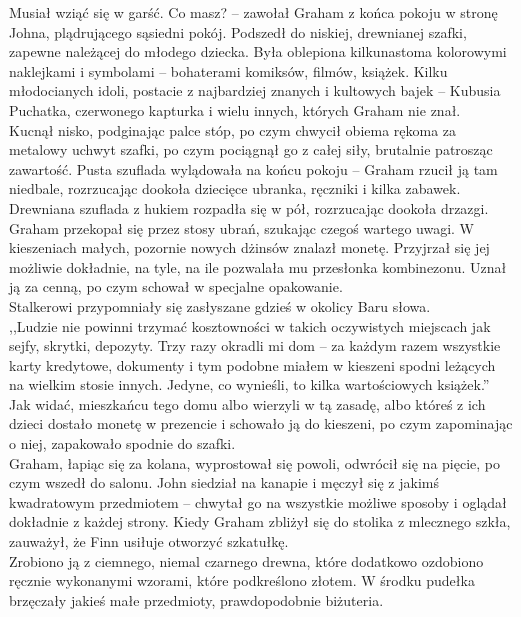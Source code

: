 \documentclass[../MAIN.tex]{subfiles}
\begin{document}
Musiał wziąć się w garść.
% 
% 
% 
% 
\sx Co masz? -- zawołał Graham z końca pokoju w stronę Johna, plądrującego sąsiedni pokój.
\qd
Podszedł do niskiej, drewnianej szafki, zapewne należącej do młodego dziecka. Była oblepiona kilkunastoma kolorowymi naklejkami i symbolami -- bohaterami komiksów, filmów, książek. Kilku młodocianych idoli, postacie z najbardziej znanych i kultowych bajek -- Kubusia Puchatka, czerwonego kapturka i wielu innych, których Graham nie znał.\\
Kucnął nisko, podginając palce stóp, po czym chwycił obiema rękoma za metalowy uchwyt szafki, po czym pociągnął go z całej siły, brutalnie patrosząc zawartość. Pusta szuflada wylądowała na końcu pokoju -- Graham rzucił ją tam niedbale, rozrzucając dookoła dziecięce ubranka, ręczniki i kilka zabawek.\\
Drewniana szuflada z hukiem rozpadła się w pół, rozrzucając dookoła drzazgi.\\
Graham przekopał się przez stosy ubrań, szukając czegoś wartego uwagi. W kieszeniach małych, pozornie nowych dżinsów znalazł monetę. Przyjrzał się jej możliwie dokładnie, na tyle, na ile pozwalała mu przesłonka kombinezonu. Uznał ją za cenną, po czym schował w specjalne opakowanie.\\
Stalkerowi przypomniały się zasłyszane gdzieś w okolicy Baru słowa.\\
,,Ludzie nie powinni trzymać kosztowności w takich oczywistych miejscach jak sejfy, skrytki, depozyty. Trzy razy okradli mi dom -- za każdym razem wszystkie karty kredytowe, dokumenty i tym podobne miałem w kieszeni spodni leżących na wielkim stosie innych. Jedyne, co wynieśli, to kilka wartościowych książek.''\\
Jak widać, mieszkańcu tego domu albo wierzyli w tą zasadę, albo któreś z ich dzieci dostało monetę w prezencie i schowało ją do kieszeni, po czym zapominając o niej, zapakowało spodnie do szafki.\\
Graham, łapiąc się za kolana, wyprostował się powoli, odwrócił się na pięcie, po czym wszedł do salonu. John siedział na kanapie i męczył się z jakimś kwadratowym przedmiotem -- chwytał go na wszystkie możliwe sposoby i oglądał dokładnie z każdej strony. Kiedy Graham zbliżył się do stolika z mlecznego szkła, zauważył, że Finn usiłuje otworzyć szkatułkę.\\
Zrobiono ją z ciemnego, niemal czarnego drewna, które dodatkowo ozdobiono ręcznie wykonanymi wzorami, które podkreślono złotem. W środku pudełka brzęczały jakieś małe przedmioty, prawdopodobnie biżuteria.
\end{document}
